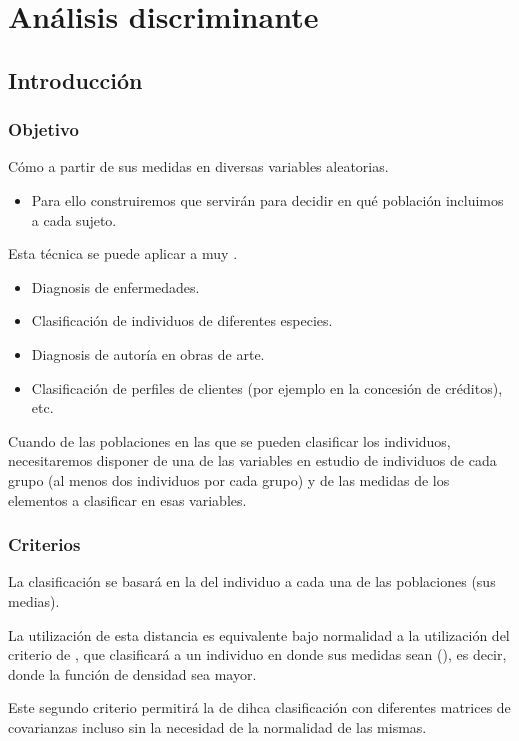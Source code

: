 \section{Análisis discriminante}
\subsection{Introducción}
\subsubsection{Objetivo}
Cómo  a partir de sus medidas en diversas variables aleatorias.
\begin{itemize}
	\item Para ello construiremos  que servirán para decidir en qué población incluimos a cada sujeto.
\end{itemize}
Esta técnica se puede aplicar a muy .
\begin{itemize}
	\item Diagnosis de enfermedades.
	\item Clasificación de individuos de diferentes especies.
	\item Diagnosis de autoría en obras de arte.
	\item Clasificación de perfiles de clientes (por ejemplo en la concesión de créditos), etc.
\end{itemize}
Cuando  de las poblaciones en las que se pueden clasificar los individuos, necesitaremos disponer de una  de las variables en estudio de individuos de cada grupo (al menos dos individuos por cada grupo) y de las medidas de los elementos a clasificar en esas variables.
\subsubsection{Criterios}
La clasificación se basará en la  del individuo a cada una de las poblaciones (sus medias).

La utilización de esta distancia es equivalente bajo normalidad a la utilización del criterio de , que clasificará a un individuo en donde sus medidas sean  (), es decir, donde la función de densidad sea mayor.

Este segundo criterio permitirá la  de dihca clasificación  con diferentes matrices de covarianzas incluso sin la necesidad de la normalidad de las mismas.
